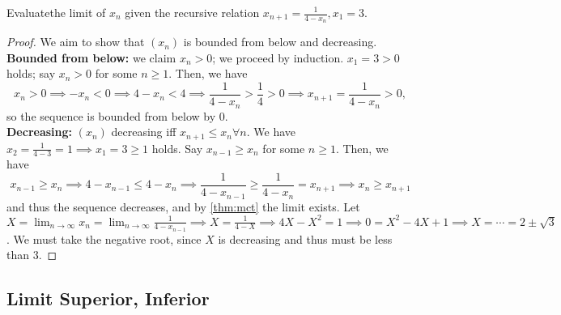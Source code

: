 \documentclass[12pt]{article}
\begin{document}
\begin{example}
  Evaluate\footnotemark the limit of $x_{n}$ given the recursive relation $x_{n+1} = \frac{1}{4-x_n}, x_1 = 3$. 
  \begin{proof}
    We aim to show that $(x_n)$ is bounded from below and decreasing.\\
    \textbf{Bounded from below: } we claim $x_n > 0$; we proceed by induction. $x_1 = 3 > 0$ holds; say $x_{n} > 0$ for some $n \geq 1$. Then, we have \[
    x_n > 0 \implies - x_n < 0 \implies 4 - x_n < 4 \implies \frac{1}{4-x_{n}} > \frac{1}{4} > 0 \implies  x_{n+1} = \frac{1}{4-x_n} > 0,
    \]
    so the sequence is bounded from below by 0.\\
    \textbf{Decreasing: } $(x_n)$ decreasing iff $x_{n + 1} \leq x_n \forall n$. We have $x_2 = \frac{1}{4-3} = 1 \implies x_1 = 3 \geq 1$ holds. Say $x_{n-1} \geq x_{n}$ for some $n \geq 1$. Then, we have \[
    x_{n-1} \geq x_n \implies 4 - x_{n-1} \leq 4 - x_{n} \implies \frac{1}{4-x_{n-1}}\geq \frac{1}{4-x_n} = x_{n+1}\implies x_{n} \geq x_{n+1}
    \]
    and thus the sequence decreases, and by \cref{thm:mct} the limit exists. Let $X = \lim_{n\to\infty} x_{n} = \lim_{n\to\infty} \frac{1}{4-x_{n-1}} \implies X = \frac{1}{4-X} \implies 4X-X^2 = 1 \implies 0 = X^2-4X+1 \implies X = \cdots = 2 \pm \sqrt{3}$. We must take the negative root, since $X$ is decreasing and thus must be less than $3$. 
  \end{proof}
\end{example}


\subsection{Limit Superior, Inferior}
\end{document}
